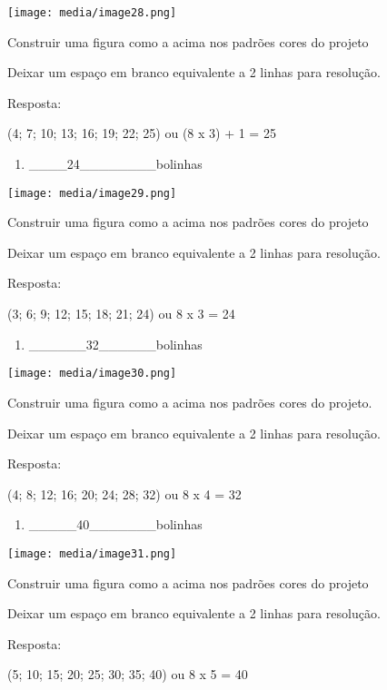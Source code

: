 \texttt{[image: media/image28.png]}

Construir uma figura como a acima nos padrões cores do projeto

Deixar um espaço em branco equivalente a 2 linhas para resolução.

Resposta:

(4; 7; 10; 13; 16; 19; 22; 25) ou (8 x 3) + 1 = 25

\begin{enumerate}
\def\labelenumi{\alph{enumi})}
\item
  \_\_\_\_24\_\_\_\_\_\_\_\_bolinhas
\end{enumerate}

\texttt{[image: media/image29.png]}

Construir uma figura como a acima nos padrões cores do projeto

Deixar um espaço em branco equivalente a 2 linhas para resolução.

Resposta:

(3; 6; 9; 12; 15; 18; 21; 24) ou 8 x 3 = 24

\begin{enumerate}
\def\labelenumi{\alph{enumi})}
\item
  \_\_\_\_\_\_32\_\_\_\_\_\_bolinhas
\end{enumerate}

\texttt{[image: media/image30.png]}

Construir uma figura como a acima nos padrões cores do projeto.

Deixar um espaço em branco equivalente a 2 linhas para resolução.

Resposta:

(4; 8; 12; 16; 20; 24; 28; 32) ou 8 x 4 = 32

\begin{enumerate}
\def\labelenumi{\alph{enumi})}
\item
  \_\_\_\_\_40\_\_\_\_\_\_\_bolinhas
\end{enumerate}

\texttt{[image: media/image31.png]}

Construir uma figura como a acima nos padrões cores do projeto

Deixar um espaço em branco equivalente a 2 linhas para resolução.

Resposta:

(5; 10; 15; 20; 25; 30; 35; 40) ou 8 x 5 = 40

